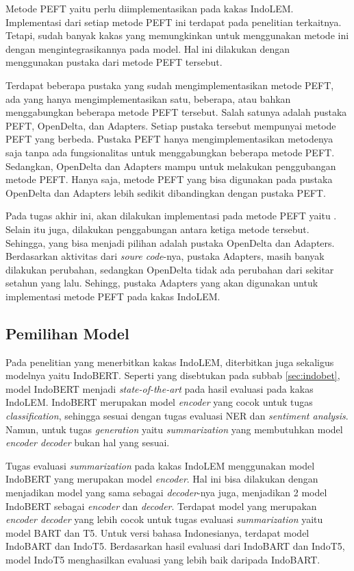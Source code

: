 Metode PEFT yaitu \methodPEFT perlu diimplementasikan pada kakas IndoLEM. Implementasi dari setiap metode PEFT ini terdapat pada penelitian terkaitnya. Tetapi, sudah banyak kakas yang memungkinkan untuk menggunakan metode ini dengan mengintegrasikannya pada model. Hal ini dilakukan dengan menggunakan pustaka dari metode PEFT tersebut.

Terdapat beberapa pustaka yang sudah mengimplementasikan metode PEFT, ada yang hanya mengimplementasikan satu, beberapa, atau bahkan menggabungkan beberapa metode PEFT tersebut. Salah satunya adalah pustaka PEFT, OpenDelta, dan Adapters. Setiap pustaka tersebut mempunyai metode PEFT yang berbeda. Pustaka PEFT hanya mengimplementasikan metodenya saja tanpa ada fungsionalitas untuk menggabungkan beberapa metode PEFT. Sedangkan, OpenDelta dan Adapters mampu untuk melakukan penggubangan metode PEFT. Hanya saja, metode PEFT yang bisa digunakan pada pustaka OpenDelta dan Adapters lebih sedikit dibandingkan dengan pustaka PEFT.

Pada tugas akhir ini, akan dilakukan implementasi pada metode PEFT yaitu \methodPEFT. Selain itu juga, dilakukan penggabungan antara ketiga metode tersebut. Sehingga, yang bisa menjadi pilihan adalah pustaka OpenDelta dan Adapters. Berdasarkan aktivitas dari \textit{soure code}-nya, pustaka Adapters, masih banyak dilakukan perubahan, sedangkan OpenDelta tidak ada perubahan dari sekitar setahun yang lalu. Sehingg, pustaka Adapters yang akan digunakan untuk implementasi metode PEFT pada kakas IndoLEM.

\subsection{Pemilihan Model}

Pada penelitian yang menerbitkan kakas IndoLEM, diterbitkan juga sekaligus modelnya yaitu IndoBERT. Seperti yang disebtukan pada subbab \ref{sec:indobet}, model IndoBERT menjadi \textit{state-of-the-art} pada hasil evaluasi pada kakas IndoLEM. IndoBERT merupakan model \textit{encoder} yang cocok untuk tugas \textit{classification}, sehingga sesuai dengan tugas evaluasi NER dan \textit{sentiment analysis}. Namun, untuk tugas \textit{generation} yaitu \textit{summarization} yang membutuhkan model \textit{encoder decoder} bukan hal yang sesuai.

Tugas evaluasi \textit{summarization} pada kakas IndoLEM menggunakan model IndoBERT yang merupakan model \textit{encoder}. Hal ini bisa dilakukan dengan menjadikan model yang sama sebagai \textit{decoder}-nya juga, menjadikan 2 model IndoBERT sebagai \textit{encoder} dan \textit{decoder}. Terdapat model yang merupakan \textit{encoder decoder} yang lebih cocok untuk tugas evaluasi \textit{summarization} yaitu model BART dan T5. Untuk versi bahasa Indonesianya, terdapat model IndoBART dan IndoT5. Berdasarkan hasil evaluasi dari IndoBART dan IndoT5, model IndoT5 menghasilkan evaluasi yang lebih baik daripada IndoBART. 

